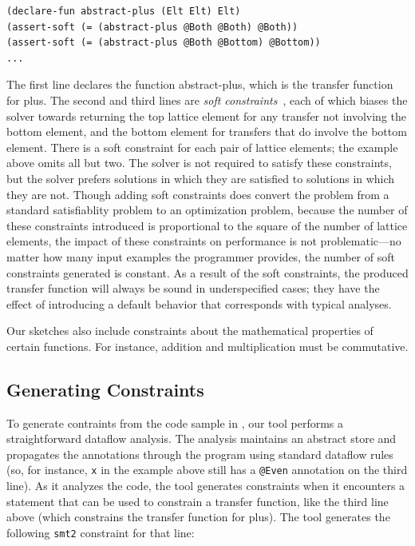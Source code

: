 \documentclass[10pt,conference]{IEEEtran}
\begin{document}
\lstset{language=[]Lisp}
\begin{lstlisting}[columns=fullflexible]
(declare-fun abstract-plus (Elt Elt) Elt)
(assert-soft (= (abstract-plus @Both @Both) @Both))
(assert-soft (= (abstract-plus @Both @Bottom) @Bottom))
...
\end{lstlisting}
\lstset{language=C}

The first line declares the function abstract-plus, which
is the transfer function for plus. The second and third lines are
\textit{soft constraints}~\cite{bjorner2015nuz},
each of which biases the solver towards returning the top lattice
element for any transfer not involving the bottom element, and the
bottom element for transfers that do involve the bottom element.
There is a soft constraint for each pair of lattice elements; the
example above omits all but two.  The solver is not required to
satisfy these constraints, but the solver prefers solutions in which they are
satisfied to solutions in which they are not.  Though adding soft
constraints does convert the problem from a standard satisfiablity
problem to an optimization problem, because the number of these
constraints introduced is proportional to the square of the number of
lattice elements, the
impact of these constraints on performance is not problematic---no
matter how many input examples the programmer provides,
the number of soft constraints generated
is constant.  As a result of the soft constraints, the produced
transfer function will always be sound in underspecified cases; they
have the effect of introducing a default behavior that corresponds
with typical analyses.

Our sketches also include constraints about the mathematical properties
of certain functions. For instance, addition and multiplication must
be commutative.

\subsection{Generating Constraints}
\label{sec-cgen}

To generate contraints from the code sample in ,
our tool
performs a straightforward dataflow analysis. The analysis
maintains an abstract store and propagates the annotations
through the program using standard dataflow rules (so, for
instance, \lstinline{x} in the example above still has
a \lstinline{@Even} annotation on the third line).
As it analyzes the code, the tool generates
constraints when it encounters a statement that
can be used to constrain a transfer function, like
the third line above (which constrains the transfer function
for plus). The tool generates
the following \lstinline{smt2} constraint for that line:
\end{document}
